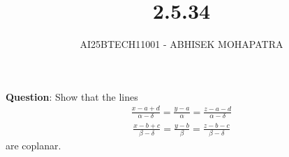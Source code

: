 \documentclass{beamer}
\title{2.5.34}
\author{AI25BTECH11001 - ABHISEK MOHAPATRA}
\numberwithin{equation}{section}
\begin{document}
{\let\newpage\relax\maketitle}
\renewcommand{\thefigure}{\theenumi}
\renewcommand{\thetable}{\theenumi}


	 	\textbf{Question}:
		Show that the lines
		\begin{align}
		\frac{x-a+d}{\alpha-\delta}=\frac{y-a}{\alpha}=\frac{z-a-d}{\alpha-\delta}
		\end{align}
		\begin{align}
		\frac{x-b+c}{\beta-\delta}=\frac{y-b}{\beta}=\frac{z-b-c}{\beta-\delta}
		\end{align}
are coplanar.
		
\end{document}
